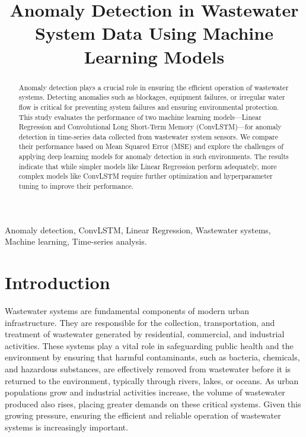 \documentclass[conference]{IEEEtran}
\begin{document}
\title{Anomaly Detection in Wastewater System Data Using Machine Learning Models}

\author{
}

\maketitle

\begin{abstract}
Anomaly detection plays a crucial role in ensuring the efficient operation of wastewater systems. Detecting anomalies such as blockages, equipment failures, or irregular water flow is critical for preventing system failures and ensuring environmental protection. This study evaluates the performance of two machine learning models—Linear Regression and Convolutional Long Short-Term Memory (ConvLSTM)—for anomaly detection in time-series data collected from wastewater system sensors. We compare their performance based on Mean Squared Error (MSE) and explore the challenges of applying deep learning models for anomaly detection in such environments. The results indicate that while simpler models like Linear Regression perform adequately, more complex models like ConvLSTM require further optimization and hyperparameter tuning to improve their performance.
\end{abstract}

\begin{IEEEkeywords}
Anomaly detection, ConvLSTM, Linear Regression, Wastewater systems, Machine learning, Time-series analysis.
\end{IEEEkeywords}

\section{Introduction}
\label{sec:intro}
Wastewater systems are fundamental components of modern urban infrastructure. They are responsible for the collection, transportation, and treatment of wastewater generated by residential, commercial, and industrial activities. These systems play a vital role in safeguarding public health and the environment by ensuring that harmful contaminants, such as bacteria, chemicals, and hazardous substances, are effectively removed from wastewater before it is returned to the environment, typically through rivers, lakes, or oceans. As urban populations grow and industrial activities increase, the volume of wastewater produced also rises, placing greater demands on these critical systems. Given this growing pressure, ensuring the efficient and reliable operation of wastewater systems is increasingly important.
\end{document}
